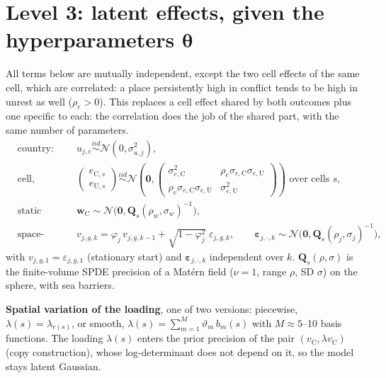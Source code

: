 \documentclass[10pt]{article}
\newcommand{\N}{\mathcal{N}}
\newcommand{\C}{\mathrm{C}}
\newcommand{\U}{\mathrm{U}}
\begin{document}
\section*{Level 3: latent effects, given the hyperparameters $\bm\theta$}
All terms below are mutually independent, except the two cell effects of the same cell, which are
correlated: a place persistently high in conflict tends to be high in unrest as well ($\rho_e > 0$).
This replaces a cell effect shared by both outcomes plus one specific to each: the correlation does
the job of the shared part, with the same number of parameters.
\begin{align*}
&\text{country:} && u_{j,c} \overset{iid}{\sim} \N(0, \sigma^2_{u,j}),\\
&\text{cell, correlated across outcomes:} && \begin{pmatrix} e_{\C,s}\\ e_{\U,s}\end{pmatrix}
\overset{iid}{\sim} \N\left(\bm 0, \begin{pmatrix} \sigma^2_{e,\C} & \rho_e\sigma_{e,\C}\sigma_{e,\U}\\
\rho_e\sigma_{e,\C}\sigma_{e,\U} & \sigma^2_{e,\U}\end{pmatrix}\right) \text{ over cells } s,\\
&\text{static field (conflict only):} && \bm w_{\C} \sim \N\bigl(\bm 0, \bm Q_s(\rho_{w}, \sigma_{w})^{-1}\bigr),\\
&\text{space-time fields:} && v_{j,g,k} = \varphi_j\, v_{j,g,k-1} + \sqrt{1-\varphi_j^2}\;\varepsilon_{j,g,k},
\qquad \bm\varepsilon_{j,\cdot,k} \sim \N\bigl(\bm 0, \bm Q_s(\rho_j, \sigma_j)^{-1}\bigr),
\end{align*}
with $v_{j,g,1} = \varepsilon_{j,g,1}$ (stationary start) and $\bm\varepsilon_{j,\cdot,k}$ independent over
$k$. $\bm Q_s(\rho,\sigma)$ is the finite-volume SPDE precision of a Mat\'ern field
($\nu = 1$, range $\rho$, SD $\sigma$) on the sphere, with sea barriers.

\textbf{Spatial variation of the loading}, one of two versions: piecewise, $\lambda(s) = \lambda_{r(s)}$, or
smooth, $\lambda(s) = \sum_{m=1}^{M} \vartheta_m\, b_m(s)$ with $M \approx 5$--10 basis functions. The loading $\lambda(s)$ enters the prior precision of the pair
$(v_{\C}, \lambda v_{\C})$ (copy construction), whose log-determinant does not depend on it, so the
model stays latent Gaussian.
\end{document}
